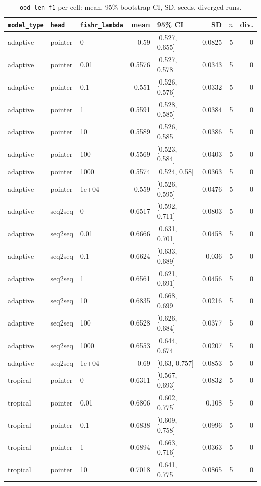 \documentclass[10pt]{article}
\begin{document}
{\small
\begin{longtable}{lllrlrrr}
\caption{\texttt{ood\_len\_f1} per cell: mean, 95\% bootstrap CI, SD, seeds, diverged runs.}\label{tab:summary-ood_len_f1}\\
\toprule
\texttt{model\_type} & \texttt{head} & \texttt{fishr\_lambda} & mean & 95\% CI & SD & $n$ & div.\\
\midrule
\endhead
adaptive & pointer & 0 & 0.59 & [0.527, 0.655] & 0.0825 & 5 & 0\\
adaptive & pointer & 0.01 & 0.5576 & [0.527, 0.578] & 0.0343 & 5 & 0\\
adaptive & pointer & 0.1 & 0.551 & [0.526, 0.576] & 0.0332 & 5 & 0\\
adaptive & pointer & 1 & 0.5591 & [0.528, 0.585] & 0.0384 & 5 & 0\\
adaptive & pointer & 10 & 0.5589 & [0.526, 0.585] & 0.0386 & 5 & 0\\
adaptive & pointer & 100 & 0.5569 & [0.523, 0.584] & 0.0403 & 5 & 0\\
adaptive & pointer & 1000 & 0.5574 & [0.524, 0.58] & 0.0363 & 5 & 0\\
adaptive & pointer & 1e+04 & 0.559 & [0.526, 0.595] & 0.0476 & 5 & 0\\
adaptive & seq2seq & 0 & 0.6517 & [0.592, 0.711] & 0.0803 & 5 & 0\\
adaptive & seq2seq & 0.01 & 0.6666 & [0.631, 0.701] & 0.0458 & 5 & 0\\
adaptive & seq2seq & 0.1 & 0.6624 & [0.633, 0.689] & 0.036 & 5 & 0\\
adaptive & seq2seq & 1 & 0.6561 & [0.621, 0.691] & 0.0456 & 5 & 0\\
adaptive & seq2seq & 10 & 0.6835 & [0.668, 0.699] & 0.0216 & 5 & 0\\
adaptive & seq2seq & 100 & 0.6528 & [0.626, 0.684] & 0.0377 & 5 & 0\\
adaptive & seq2seq & 1000 & 0.6553 & [0.644, 0.674] & 0.0207 & 5 & 0\\
adaptive & seq2seq & 1e+04 & 0.69 & [0.63, 0.757] & 0.0853 & 5 & 0\\
tropical & pointer & 0 & 0.6311 & [0.567, 0.693] & 0.0832 & 5 & 0\\
tropical & pointer & 0.01 & 0.6806 & [0.602, 0.775] & 0.108 & 5 & 0\\
tropical & pointer & 0.1 & 0.6838 & [0.609, 0.758] & 0.0996 & 5 & 0\\
tropical & pointer & 1 & 0.6894 & [0.663, 0.716] & 0.0363 & 5 & 0\\
tropical & pointer & 10 & 0.7018 & [0.641, 0.775] & 0.0865 & 5 & 0\\

\end{longtable}}
\end{document}
